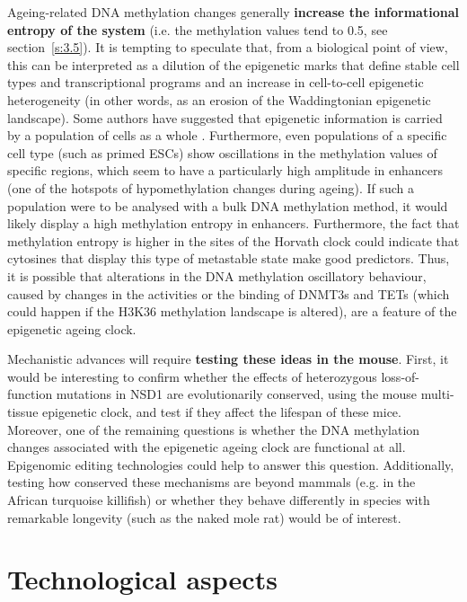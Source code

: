 Ageing-related DNA methylation changes generally \textbf{increase the informational entropy of the system} (i.e. the methylation values tend to 0.5, see section~\ref{s:3.5}). It is tempting to speculate that, from a biological point of view, this can be interpreted as a dilution of the epigenetic marks that define stable cell types and transcriptional programs and an increase in cell-to-cell epigenetic heterogeneity (in other words, as an erosion of the Waddingtonian epigenetic landscape). Some authors have suggested that epigenetic information is carried by a population of cells as a whole \cite{Jenkinson2017,Shipony2014}. Furthermore, even populations of a specific cell type (such as primed \acrshort{ESCs}) show oscillations in the methylation values of specific regions, which seem to have a particularly high amplitude in enhancers \cite{Rulands2018} (one of the hotspots of hypomethylation changes during ageing). If such a population were to be analysed with a bulk DNA methylation method, it would likely display a high methylation entropy in enhancers. Furthermore, the fact that methylation entropy is higher in the sites of the Horvath clock could indicate that cytosines that display this type of metastable state make good predictors. Thus, it is possible that alterations in the DNA methylation oscillatory behaviour, caused by changes in the activities or the binding of DNMT3s and TETs (which could happen if the H3K36 methylation landscape is altered), are a feature of the epigenetic ageing clock.

\bigskip

Mechanistic advances will require \textbf{testing these ideas in the mouse}. First, it would be interesting to confirm whether the effects of heterozygous loss-of-function mutations in NSD1 are evolutionarily conserved, using the mouse multi-tissue epigenetic clock, and test if they affect the lifespan of these mice. Moreover, one of the remaining questions is whether the DNA methylation changes associated with the epigenetic ageing clock are functional at all. Epigenomic editing technologies \cite{Liu2016a} could help to answer this question. Additionally, testing how conserved these mechanisms are beyond mammals (e.g. in the African turquoise killifish) or whether they behave differently in species with remarkable longevity (such as the naked mole rat) would be of interest. 

\smallskip

\section{Technological aspects}

